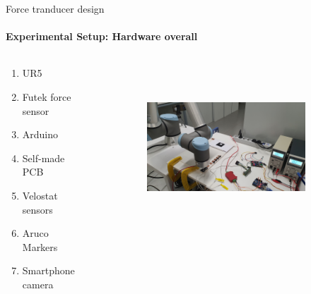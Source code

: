 \documentclass[aspectratio=169]{beamer}
\begin{document}
\begin{frame}[t]{Force tranducer design}
    \framesubtitle{Experimental Setup: Hardware overall}
    \vspace{-15pt}
    \begin{columns}[T,onlytextwidth]
        \begin{column}{0.3\textwidth}
            \begin{enumerate}
                \item UR5
                \item Futek force sensor
                \item Arduino
                \item Self-made PCB
                \item Velostat sensors
                \item Aruco Markers
                \item Smartphone camera
            \end{enumerate}
        \end{column}
        \begin{column}{0.69\textwidth}
            \begin{figure}[H]
                \begin{subfigure}{\textwidth}
                    \centering\includegraphics[height=6cm,width=1\textwidth,keepaspectratio]{exp_stand1}
                    \label{fig:exp_stand1}
                \end{subfigure}
            \end{figure}
        \end{column}
    \end{columns}
\end{frame}
\end{document}
